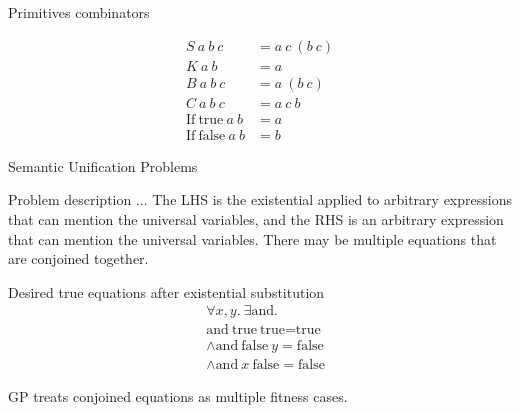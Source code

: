 \documentclass[mathserif]{beamer}
\newcommand{\n}[1]{\textrm{#1}}
\begin{document}
\begin{frame}{Primitives combinators}

\begin{align*}
S ~ a ~ b ~ c &= a ~ c ~ (b ~ c)\\
K ~ a ~ b &= a\\
B ~ a ~ b ~ c &= a ~ (b ~ c)\\
C ~ a ~ b ~ c &= a ~ c ~ b\\
\n{If} ~ \n{true} ~ a ~ b &= a\\
\n{If} ~ \n{false} ~ a ~ b &= b
\end{align*}

\end{frame}

\begin{frame}{Semantic Unification Problems}

\begin{block}{Problem description}
... The LHS is the existential
applied to arbitrary expressions that can mention the universal
variables, and the RHS is an arbitrary
expression that can mention the universal variables. There may be
multiple equations that are conjoined together.
\end{block}

\begin{block}{Desired true equations after existential substitution}
\begin{align*}
&\forall x,y . ~ \exists \n{and} .\\
&\n{and} ~ \n{true} ~ \n{true} = \n{true}\\
&\land \n{and} ~ \n{false} ~ y = \n{false}\\
&\land \n{and} ~ x ~ \n{false} = \n{false}
\end{align*}
\end{block}

GP treats conjoined equations as multiple fitness cases.

\end{frame}
\end{document}
